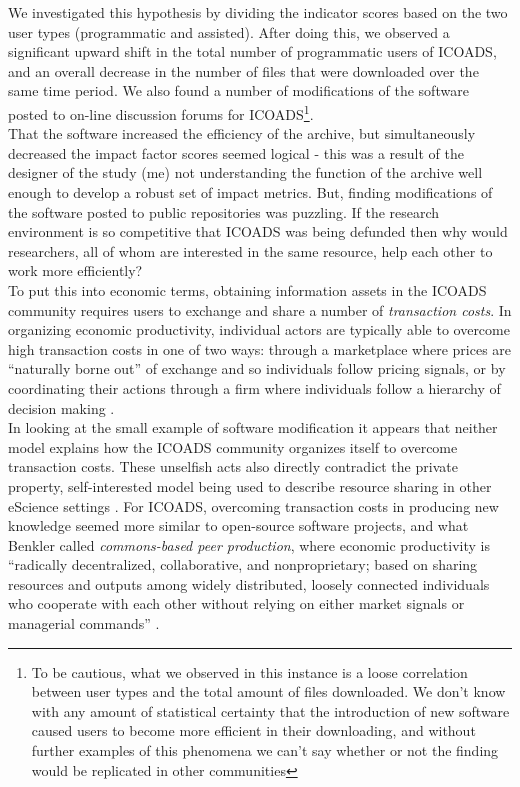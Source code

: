 \documentclass[thesis,tocnosub,noragright,centerchapter,12pt]{uiucecethesis09}
\begin{document}
We investigated this hypothesis by dividing the indicator scores based
on the two user types (programmatic and assisted). After doing this, we
observed a significant upward shift in the total number of programmatic
users of ICOADS, and an overall decrease in the number of
files that were downloaded over the same time period. We also found a number of
modifications of the software posted to on-line discussion forums for
ICOADS\footnote{To be cautious, what we observed in this instance
is a loose correlation between user types and the total amount of files
downloaded. We don't know with any amount of statistical certainty that
the introduction of new software caused users to become more efficient
in their downloading, and without further examples of this phenomena we
can't say whether or not the finding would be replicated in other
communities}.\\

That the software increased the efficiency of the archive, but
simultaneously decreased the impact factor scores seemed logical - this
was a result of the designer of the study (me) not understanding the
function of the archive well enough to develop a robust set of impact
metrics. But, finding modifications of the software posted to public
repositories was puzzling. If the research environment is so
competitive that ICOADS was being defunded then why would researchers, all of whom are interested in the same resource, help each other to work more efficiently? \\

To put this into economic terms, obtaining information assets in the
ICOADS community requires users to exchange and share a number of
\emph{transaction costs}. In organizing economic productivity, individual actors
are typically able to overcome high transaction costs in one of two ways: through a
marketplace where prices are ``naturally borne out'' of exchange and so
individuals follow pricing signals, or by coordinating their actions
through a firm where individuals follow a hierarchy of decision making \citep{coase1937nature, williamson1975markets}.\\

In looking at the small example of software modification it appears that
neither model explains how the ICOADS community organizes itself to
overcome transaction costs. These unselfish acts also directly contradict the private property, self-interested model being used to
describe resource sharing in other eScience settings \citep[e.g.][]{birnholtz2003data, zimmerman2008new, wallis2013if}.
For ICOADS, overcoming transaction costs in producing new knowledge seemed more
similar to open-source software projects, and what Benkler called
\emph{commons-based peer production}, where economic productivity is
``radically decentralized, collaborative, and nonproprietary; based on
sharing resources and outputs among widely distributed, loosely
connected individuals who cooperate with each other without relying on
either market signals or managerial commands'' \citeyearpar[p. 60]{benkler2006wealth}.\\
\end{document}
